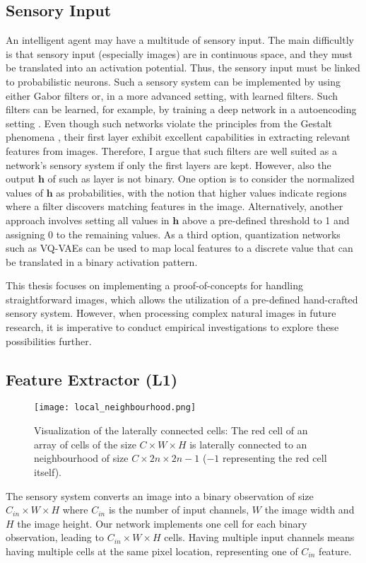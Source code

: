 \subsection{Sensory Input}
An intelligent agent may have a multitude of sensory input. The main difficultly is that sensory input (especially images) are in continuous space, and they must be translated into an activation potential.
Thus, the sensory input must be linked to probabilistic neurons. Such a sensory system can be implemented by using either Gabor filters  or, in a more advanced setting, with learned filters.
Such filters can be learned, for example, by training a deep network in a autoencoding setting . Even though such networks violate the principles from the Gestalt phenomena \cite{ellis_source_1938, kohler_gestalt_1992, wagemans_century_2012, hamlyn_psychology_2017}, their first layer exhibit excellent capabilities in extracting relevant features from images. Therefore, I argue that such filters are well suited as a network's sensory system if only the first layers are kept. However, also the output $\boldsymbol{h}$ of such as layer is not binary.
One option is to consider the normalized values of $\boldsymbol{h}$ as probabilities, with the notion that higher values indicate regions where a filter discovers matching features in the image. Alternatively, another approach involves setting all values in $\boldsymbol{h}$ above a pre-defined threshold to 1 and assigning 0 to the remaining values.
As a third option, quantization networks such as VQ-VAEs  can be used to map local features to a discrete value that can be translated in a binary activation pattern.

This thesis focuses on implementing a proof-of-concepts for handling straightforward images, which allows the utilization of a pre-defined hand-crafted sensory system. However, when processing complex natural images in future research, it is imperative to conduct empirical investigations to explore these possibilities further.

\subsection{Feature Extractor (L1)}
\begin{figure}[h]
    \centering
    \texttt{[image: local\_neighbourhood.png]}
    \caption[Laterally connected cells]{Visualization of the laterally connected cells: The red cell of an array of cells of the size $C \times W \times H$ is laterally connected to an neighbourhood of size  $C \times 2n \times 2n - 1$ ($-1$ representing the red cell itself).}
\end{figure}
The sensory system converts an image into a binary observation of size $C_{in} \times W \times H$ where $C_{in}$ is the number of input channels, $W$ the image width and $H$ the image height.
Our network implements one cell for each binary observation, leading to $C_{in} \times W \times H$ cells.
Having multiple input channels means having multiple cells at the same pixel location, representing one of $C_{in}$ feature.

